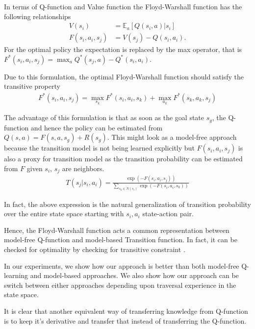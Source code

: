 \documentclass[letterpaper]{article} %
\def\state{s}
\def\act{a}
\def\Rew{R}
\def\E{\mathbb{E}}
\newcommand{\state}[2]{\mathbf{s}^{#1}(#2)}
\begin{document}
In terms of Q-function and Value function the Floyd-Warshall function has the following relationships
\begin{align}
V(\state_i) &= \E_{\act}[Q(\state_i, \act)|\state_i] \\
F(\state_i, \act_i, \state_j) &= V(\state_j) - Q(\state_i, \act_i).
\end{align}
For the optimal policy the expectation is replaced by the max operator, that is $F^*(\state_i, \act_i, \state_j) = \max_{\act} Q^*(\state_j, \act) - Q^*(\state_i, \act_i)$.

Due to this formulation, the optimal Floyd-Warshall function should satisfy the transitive property
\begin{align}
F^*(\state_i, \act_i, \state_j) = \max_{\state_k} F^*(\state_i, \act_i, \state_k)
+ \max_{\act_k}F^*(\state_k, \act_k, \state_j)
\label{eq:transitive-fw}
\end{align}

The advantage of this formulation is that as soon as the goal state $\state_g$, the Q-function and
hence the policy can be estimated from $Q(\state, \act) = F(\state, \act, \state_g) + \Rew(\state_g)$.
This might look as a model-free approach because the transition model is not being learned explicitly but $F(\state_i, \act_i, \state_j)$ is also a proxy for transition model as the transition probability can be estimated  from $F$ given $\state_i$, $\state_j$ are neighbors.
\begin{align}
T(\state_j | \state_i, \act_i) = \frac{\exp(-F(\state_i, \act_i, \state_j))}
{\sum_{\state_k \in N(\state_i)} \exp(-F(\state_i, \act_i, \state_k))}
\end{align}

In fact, the above expression is the natural generalization of transition probability over the entire state space starting with $\state_i, \act_i$ state-action pair.

Hence, the Floyd-Warshall function acts a common representation between model-free Q-function and
model-based Transition function. In fact, it can be checked for optimality by checking for
transitive constraint \label{eq:transitive-fw}.

In our experiments, we show how our approach is better than both model-free Q-learning and model-based approaches. We also show how our approach can be switch between either approaches depending upon traversal experience in the state space.

It is clear that another equivalent way of transferring knowledge from Q-function is to keep it's derivative and transfer that instead of transferring the Q-function.
\end{document}
